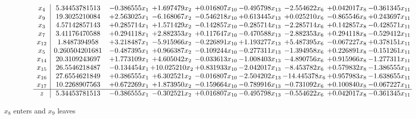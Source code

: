 \documentclass[10pt]{article}
\begin{document}
 \[\begin{array}{c| c c@{\hskip 2pt} c@{\hskip 2pt} c@{\hskip 2pt} c@{\hskip 2pt} c@{\hskip 2pt} c@{\hskip 2pt} c@{\hskip 2pt} }
 x_{4}   &  5.34453781513 & -0.386555 x_{1} & + 1.697479 x_{2} & + 0.016807 x_{10} & -0.495798 x_{13} & -2.554622 x_{6} & + 0.042017 x_{8} & -0.361345 x_{11}\\
 x_{9}   &  19.3025210084 & + 2.563025 x_{1} & -6.168067 x_{2} & -0.546218 x_{10} & + 0.613445 x_{13} & + 0.025210 x_{6} & -0.865546 x_{8} & + 0.243697 x_{11}\\
 x_{3}   &  4.57142857143 & + 0.285714 x_{1} & + 1.571429 x_{2} & -0.142857 x_{10} & -0.285714 x_{13} & -2.285714 x_{6} & + 0.142857 x_{8} & -0.428571 x_{11}\\
 x_{7}   &  3.41176470588 & + 0.294118 x_{1} & + 2.882353 x_{2} & + 0.117647 x_{10} & -0.470588 x_{13} & -2.882353 x_{6} & + 0.294118 x_{8} & -0.529412 x_{11}\\
 x_{12}   &  1.8487394958 & + 3.218487 x_{1} & -5.915966 x_{2} & -0.226891 x_{10} & + 1.193277 x_{13} & + 5.487395 x_{6} & -0.067227 x_{8} & + 0.378151 x_{11}\\
 x_{5}   &  0.260504201681 & -0.487395 x_{1} & + 0.966387 x_{2} & -0.109244 x_{10} & -0.277311 x_{13} & -1.394958 x_{6} & + 0.226891 x_{8} & -0.151261 x_{11}\\
 x_{14}   &  20.3109243697 & + 1.773109 x_{1} & + 4.605042 x_{2} & -0.033613 x_{10} & -1.008403 x_{13} & -4.890756 x_{6} & + 0.915966 x_{8} & -1.277311 x_{11}\\
 x_{15}   &  26.5546218487 & -0.134454 x_{1} & + 10.025210 x_{2} & + 0.831933 x_{10} & -2.042017 x_{13} & -8.453782 x_{6} & + 0.579832 x_{8} & -1.386555 x_{11}\\
 x_{16}   &  27.6554621849 & + 0.386555 x_{1} & + 6.302521 x_{2} & -0.016807 x_{10} & -2.504202 x_{13} & -14.445378 x_{6} & + 0.957983 x_{8} & -1.638655 x_{11}\\
 x_{17}   &  10.2268907563 & + 0.672269 x_{1} & + 1.873950 x_{2} & -0.159664 x_{10} & -0.789916 x_{13} & -0.731092 x_{6} & + 0.100840 x_{8} & -0.067227 x_{11}\\
\hline
z    &  5.34453781513 & -0.386555 x_{1} & -0.302521 x_{2} & + 0.016807 x_{10} & -0.495798 x_{13} & -0.554622 x_{6} & + 0.042017 x_{8} & -0.361345 x_{11}\\
\end{array}\]


 $ x_{8} $ enters and $ x_{9} $ leaves 
\end{document}

